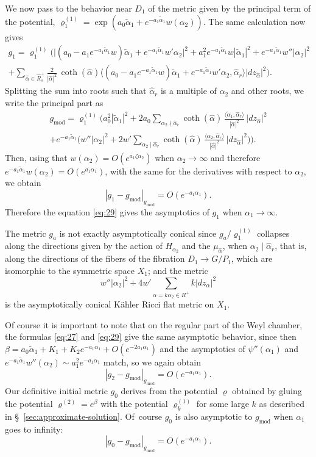 \documentclass[JEP,XML,SOM,Unicode, NoEqCountersInSection, NoFloatCountersInSection]{cedram}
\theoremstyle{plain}
\theoremstyle{definition}
\DeclareMathOperator{\mo}{mod}
\newcommand{\ta}{\tilde \alpha}
\newcommand{\ha}{\hat{\alpha}}
\newcommand{\Roots}{\hat{R}}
\newcommand{\rhodeux}{\varrho^{(2)}}
\newcommand{\rhoun}{\varrho^{(1)}}
\begin{document}
We now pass to the behavior near $D_1$ of the metric given by the principal term of the potential, $\rhoun_1=\exp(a_0\ta_1+e^{-a_1\ta_1} w(\alpha_2))$. The same calculation now gives
\begin{multline*}
g_1 = \rhoun_1 \Big( \big|(a_0-a_1e^{-a_1\ta_1}w)\ta_1+e^{-a_1\ta_1} w'\alpha_2\big|^2  + a_1^2e^{-a_1\ta_1} w |\ta_1|^2 + e^{-a_1\ta_1}w'' |\alpha_2|^2 \\
 + \sum_{\ha\in \Roots_s^+} \frac2{|\ha|^2}\, \coth(\ha) \big\langle(a_0-a_1e^{-a_1\ta_1}w)\ta_1+e^{-a_1\ta_1}w'\alpha_2,\ha_r\big\rangle |dz_{\ha}|^2 \Big).
\end{multline*}
Splitting the sum into roots such that $\ha_r$ is a multiple of $\alpha_2$ and other roots, we write the principal part as
\begin{multline}\label{eq:29}
g_{\mo} = \rhoun_1 \biggl( a_0^2|\ta_1|^2 + 2a_0 \sum_{\alpha_2 \nmid \ha_r} \coth(\ha)\, \frac{\langle\ta_1,\ha_r\rangle}{|\ha|^2}\, |dz_{\ha}|^2 \\
+ e^{-a_1\ta_1} \Big( w'' |\alpha_2|^2 + 2w' \sum_{\alpha_2 \mid \ha_r} \coth(\ha)\, \frac{\langle\alpha_2,\ha_r\rangle}{|\ha|^2}\, |dz_{\ha}|^2 \Big) \biggr).
\end{multline}
Then, using that $w(\alpha_2)=O(e^{a_1\zeta\alpha_2})$ when $\alpha_2\to\infty$ and therefore $e^{-a_1\ta_1}w(\alpha_2)=O(e^{a_1\alpha_1})$, with the same for the derivatives with respect to $\alpha_2$, we obtain
\begin{equation}
| g_1 - g_{\mo} |_{g_{\mo}} = O(e^{-a_1\alpha_1}).
\end{equation}
Therefore the equation \eqref{eq:29} gives the asymptotics of $g_1$ when $\alpha_1\to\infty$.

The metric $g_a$ is not exactly asymptotically conical since $g_a/\rhoun_1$ collapses along the directions given by the action of $H_{\alpha_2}$ and the $\mu_{\ha}$, when $\alpha_2\mid\ha_r$, that is, along the directions of the fibers of the fibration $D_1\to G/P_1$, which are isomorphic to the symmetric space $X_1$; and the metric \[ w'' |\alpha_2|^2 + 4w' \sum_{\alpha=k\alpha_2\in R^+} k |dz_\alpha|^2 \] is the asymptotically conical Kähler Ricci flat metric on $X_1$.

Of course it is important to note that on the regular part of the Weyl chamber, the formulas \eqref{eq:27} and \eqref{eq:29} give the same asymptotic behavior, since then $\beta= a_0\ta_1+K_1+K_2e^{-a_1\alpha_1}+O(e^{-2a_1\alpha_1})$ and the asymptotics of $\psi''(\alpha_1)$ and $e^{-a_1\ta_1}w''(\alpha_2)\sim a_1^2e^{-a_1\alpha_1}$ match, so we again obtain
\[ |g_2-g_{\mo}|_{g_{\mo}} = O(e^{-a_1\alpha_1}). \]
Our definitive initial metric $g_0$ derives from the potential $\varrho$ obtained by gluing the potential $\rhodeux=e^\beta$ with the potential $\rhoun_k$ for some large $k$ as described in §~\ref{sec:approximate-solution}. Of~course $g_0$ is also asymptotic to $g_{\mo}$ when $\alpha_1$ goes to infinity:
\[ |g_0-g_{\mo}|_{g_{\mo}} = O(e^{-a_1\alpha_1}). \]
\end{document}
